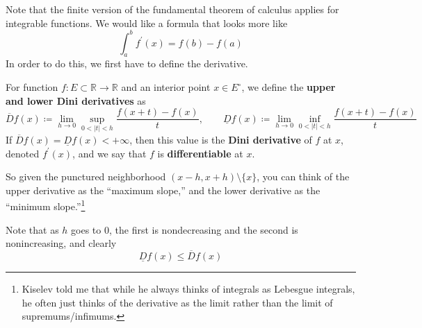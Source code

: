   Note that the finite version of the fundamental theorem of calculus applies for integrable functions. We would like a formula that looks more like 
  \begin{equation}
    \int_a^b f^\prime (x) = f(b) - f(a)
  \end{equation}
  In order to do this, we first have to define the derivative. 

  \begin{definition}
    \label{def:dini-der}
    For function $f: E \subset \mathbb{R} \to \mathbb{R}$ and an interior point $x \in E^\circ$, we define the \textbf{upper and lower Dini derivatives} as 
    \begin{equation}
      \overline{D} f(x) \coloneqq \lim_{h \to 0} \sup_{0 < |t| < h} \frac{f(x + t) - f(x)}{t}, \qquad \underline{D} f(x) \coloneqq \lim_{h \to 0} \inf_{0 < |t| < h} \frac{f(x + t) - f(x)}{t}
    \end{equation}
    If $\overline{D} f (x) = \underline{D} f (x) < +\infty$, then this value is the \textbf{Dini derivative} of $f$ at $x$, denoted $f^\prime (x)$, and we say that $f$ is \textbf{differentiable} at $x$. 
  \end{definition} 

  So given the punctured neighborhood $(x - h, x + h) \setminus \{x\}$, you can think of the upper derivative as the ``maximum slope,'' and the lower derivative as the ``minimum slope.''\footnote{Kiselev told me that while he always thinks of integrals as Lebesgue integrals, he often just thinks of the derivative as the limit rather than the limit of supremums/infimums.}

  Note that as $h$ goes to $0$, the first is nondecreasing and the second is nonincreasing, and clearly 
  \begin{equation}
    \underline{D} f(x) \leq \overline{D} f(x)
  \end{equation}
 
